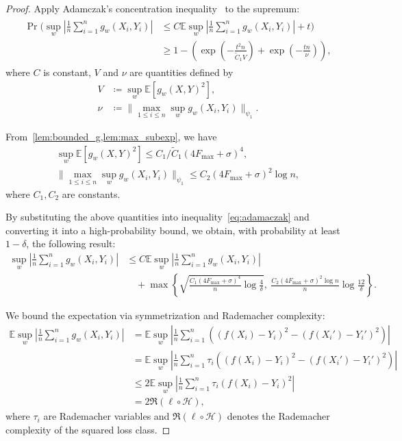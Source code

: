 \documentclass{article}
\theoremstyle{plain}
\theoremstyle{definition}
\theoremstyle{remark}
\begin{document}
\begin{proof}
Apply Adamczak's concentration inequality~\citep{adamczak2008tail} to the supremum:
\begin{align}
\label{eq:adamaczak}
\begin{aligned}
\Pr\Biggl(
\sup_w \left| \frac{1}{n} \sum_{i=1}^n g_w(X_i, Y_i) \right|
&\leq C \mathbb{E} \sup_w \left| \frac{1}{n} \sum_{i=1}^n g_w(X_i, Y_i) \right| + t
\Biggr) \\
&\geq 1 - \left(
\exp\left( - \frac{t^2 n}{\tilde{C}_1 V} \right)
+ \exp\left( - \frac{t n}{\nu}\right)
\right),
\end{aligned}
\end{align}
where $C$ is constant, $V$ and $\nu$ are quantities defined by
\begin{align*}
    V &\coloneqq  \sup_w \mathbb{E}[g_w(X, Y)^2], \\
    \nu &\coloneqq \| \max_{1 \leq i \leq n} \sup_w g_w(X_i, Y_i)\|_{\psi_1}.
\end{align*}

From~\cref{lem:bounded_g,lem:max_subexp}, we have
\begin{gather*}
    \sup_w \mathbb{E}[g_w(X, Y)^2] \leq C_1/\tilde{C}_1 (4F_{\max} + \sigma)^4, \\
    \| \max_{1 \leq i \leq n} \sup_w g_w(X_i, Y_i)\|_{\psi_1} \leq  C_2(4F_{\max} + \sigma)^2 \log n,
\end{gather*}
where $C_1, C_2$ are constants. 

By substituting the above quantities into inequality~\cref{eq:adamaczak} and converting it into a high-probability bound, we obtain, with probability at least $1 - \delta$, the following result:
\begin{align}
\label{eq:adamaczak2}
\sup_w \left| \frac{1}{n} \sum_{i=1}^n g_w(X_i, Y_i) \right|
&\leq C \mathbb{E} \sup_w \left| \frac{1}{n} \sum_{i=1}^n g_w(X_i, Y_i) \right| \nonumber \\
&\quad + \max \left\{
\sqrt{\frac{C_1(4F_{\max} + \sigma)^4}{n} \log \frac{4}{\delta}},\ 
\frac{C_2(4F_{\max} + \sigma)^2 \log n}{n} \log \frac{12}{\delta}
\right\}.
\end{align}

We bound the expectation via symmetrization and Rademacher complexity:
\begin{align}
\label{eq:symmetry_rad}
\mathbb{E} \sup_w \left| \frac{1}{n} \sum_{i=1}^n g_w(X_i, Y_i) \right|
&= \mathbb{E} \sup_w \left| \frac{1}{n} \sum_{i=1}^n 
\left((f(X_i) - Y_i)^2 - (f(X_i') - Y_i')^2 \right) \right| \nonumber \\
&= \mathbb{E} \sup_w \left| \frac{1}{n} \sum_{i=1}^n \tau_i 
\left((f(X_i) - Y_i)^2 - (f(X_i') - Y_i')^2 \right) \right| \nonumber \\
&\leq 2 \mathbb{E} \sup_w \left| \frac{1}{n} \sum_{i=1}^n \tau_i (f(X_i) - Y_i)^2 \right| \nonumber \\
&= 2 \mathfrak{R}(\ell \circ \mathcal{H}),
\end{align}
where $\tau_i$ are Rademacher variables and $\mathfrak{R}(\ell \circ \mathcal{H})$ denotes the Rademacher complexity of the squared loss class.


\end{proof}
\end{document}
